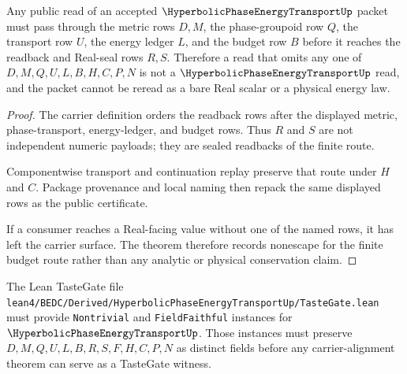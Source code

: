 \begin{theorem}
\label{thm:hyperbolic-phase-energy-transport-budget-nonescape}
Any public read of an accepted $\HyperbolicPhaseEnergyTransportUp$ packet must pass through the metric rows $D,M$, the phase-groupoid row $Q$, the transport row $U$, the energy ledger $L$, and the budget row $B$ before it reaches the readback and Real-seal rows $R,S$. Therefore a read that omits any one of $D,M,Q,U,L,B,H,C,P,N$ is not a $\HyperbolicPhaseEnergyTransportUp$ read, and the packet cannot be reread as a bare Real scalar or a physical energy law.
\end{theorem}
\begin{proof}
The carrier definition orders the readback rows after the displayed metric, phase-transport, energy-ledger, and budget rows. Thus $R$ and $S$ are not independent numeric payloads; they are sealed readbacks of the finite route.

Componentwise transport and continuation replay preserve that route under $H$ and $C$. Package provenance and local naming then repack the same displayed rows as the public certificate.

If a consumer reaches a Real-facing value without one of the named rows, it has left the carrier surface. The theorem therefore records nonescape for the finite budget route rather than any analytic or physical conservation claim.
\end{proof}



The Lean TasteGate file \texttt{lean4/BEDC/Derived/HyperbolicPhaseEnergyTransportUp/TasteGate.lean} must provide \texttt{Nontrivial} and \texttt{FieldFaithful} instances for $\HyperbolicPhaseEnergyTransportUp$. Those instances must preserve $D,M,Q,U,L,B,R,S,F,H,C,P,N$ as distinct fields before any carrier-alignment theorem can serve as a TasteGate witness.

